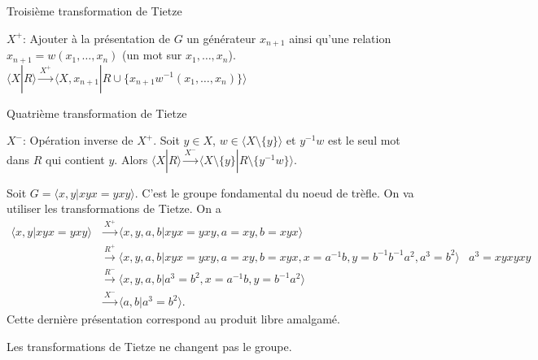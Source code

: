    \begin{algorithm}
     \caption{Troisième transformation de Tietze}
     \label{alg:trans-tietze-3}
     \begin{algorithmic}
       \State $X^+$: Ajouter à la présentation de $G$ un générateur $x_{n+1}$ ainsi qu'une relation $x_{n+1} = w(x_1,
       \ldots, x_n)$ (un mot sur $x_1, \ldots, x_n$).
       \State $\langle X | R \rangle \xrightarrow{X^+} \langle X, x_{n+1} | R \cup \{ x_{n+1}w^{-1}(x_1, \ldots, x_n)\} \rangle$
     \end{algorithmic}
   \end{algorithm}


   \begin{algorithm}
     \caption{Quatrième transformation de Tietze}
     \label{alg:trans-tietze-4}
     \begin{algorithmic}
       \State $X^-$: Opération inverse de $X^+$.
       \State Soit $y \in X$, $w \in \langle X \setminus \{y\} \rangle$ et $y^{-1}w$ est le seul mot dans $R$
       qui contient $y$. Alors
       \State $\langle X | R \rangle \xrightarrow{X^-} \langle X \setminus \{y\} | R \setminus \{y^{-1}w\} \rangle$.
     \end{algorithmic}
   \end{algorithm}

   \begin{ex}
     Soit $G = \langle x,y | xyx = yxy \rangle$. C'est le groupe fondamental du noeud de trèfle. On va
     utiliser les transformations de Tietze. On a
     \begin{align*}
       \langle x,y | xyx = yxy \rangle &\xrightarrow{X^+} \langle x,y,a,b | xyx = yxy, a=xy, b=xyx \rangle\\
       &\xrightarrow{R^+} \langle x,y,a,b | xyx=yxy, a=xy, b=xyx, x=a^{-1}b, y = b^{-1} b^{-1}a^2, a^3 = b^2
         \rangle & a^3 = xyxyxy\\
       &\xrightarrow{R^-} \langle x,y,a,b | a^3 = b^2, x = a^{-1}b, y = b^{-1}a^2 \rangle\\
       &\xrightarrow{X^-} \langle a,b | a^3 = b^2 \rangle.
     \end{align*}
     Cette dernière présentation correspond au produit libre amalgamé.
   \end{ex}


   \begin{prop} \label{prop:de-Tietze} 
     Les transformations de Tietze ne changent pas le groupe.
   \end{prop}

